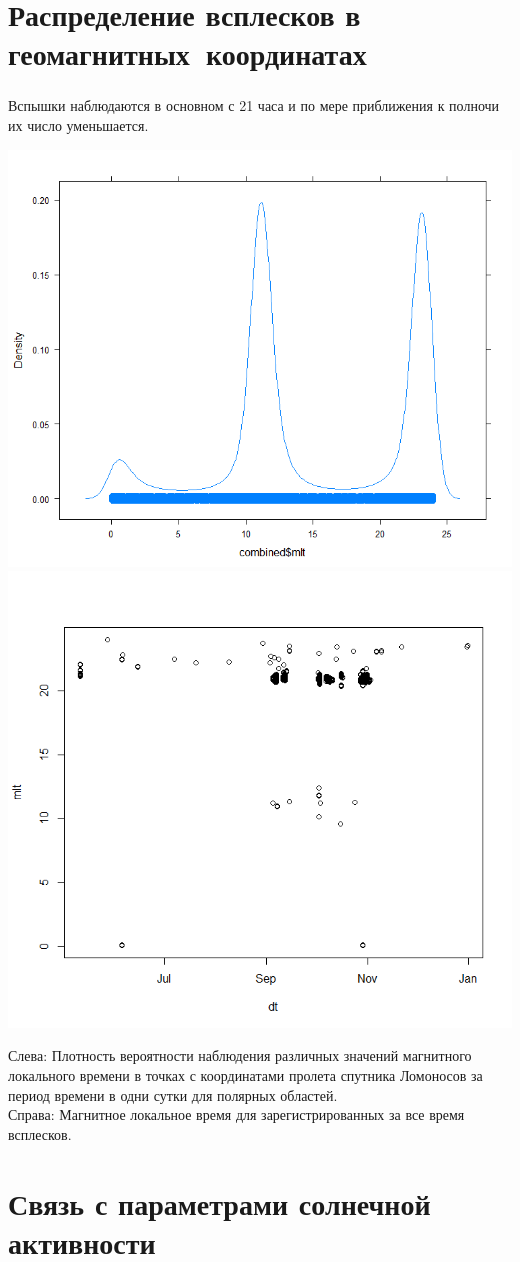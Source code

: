 \documentclass[t, aspectratio=43]{beamer}
\begin{document}
\section{Распределение всплесков в геомагнитных~координатах}

\begin{frame}	
\frametitle{\insertsection} 

{\tiny Вспышки наблюдаются в основном с 21 часа и по мере приближения к полночи их число уменьшается.}

	\centering
	\includegraphics[width=0.49\linewidth]{images/Rplot020}
	\includegraphics[width=0.49\linewidth, trim={0 1cm 0 0}, clip]{images/Rplot14}
	
	\tiny{Слева: Плотность вероятности наблюдения различных значений магнитного локального времени в точках с координатами пролета спутника Ломоносов за период времени в одни сутки для полярных областей. \\Справа: Магнитное локальное время для зарегистрированных за все время всплесков.}

\end{frame}

\section{Связь с параметрами солнечной активности}
\end{document}

